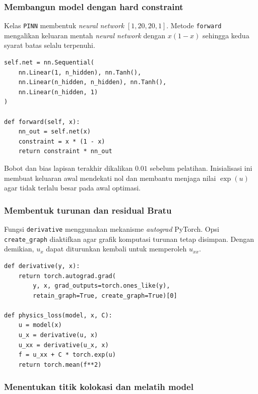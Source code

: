 \documentclass[12pt, letterpaper]{article}
\begin{document}
\subsubsection{Membangun model dengan hard constraint}

Kelas \texttt{PINN} membentuk \textit{neural network} $[1,20,20,1]$. Metode
\texttt{forward} mengalikan keluaran mentah \textit{neural network} dengan $x(1-x)$ sehingga
kedua syarat batas selalu terpenuhi.

\begin{lstlisting}[caption={Arsitektur PINN untuk persamaan Bratu}]
self.net = nn.Sequential(
    nn.Linear(1, n_hidden), nn.Tanh(),
    nn.Linear(n_hidden, n_hidden), nn.Tanh(),
    nn.Linear(n_hidden, 1)
)

def forward(self, x):
    nn_out = self.net(x)
    constraint = x * (1 - x)
    return constraint * nn_out
\end{lstlisting}

Bobot dan bias lapisan terakhir dikalikan $0.01$ sebelum pelatihan. Inisialisasi
ini membuat keluaran awal mendekati nol dan membantu menjaga nilai
$\exp(u)$ agar tidak terlalu besar pada awal optimasi.

\subsubsection{Membentuk turunan dan residual Bratu}

Fungsi \texttt{derivative} menggunakan mekanisme \textit{autograd} PyTorch.
Opsi \texttt{create\_graph} diaktifkan agar grafik komputasi turunan tetap
disimpan. Dengan demikian, $u_x$ dapat diturunkan kembali untuk memperoleh
$u_{xx}$.

\begin{lstlisting}[caption={Automatic differentiation dan residual Bratu}]
def derivative(y, x):
    return torch.autograd.grad(
        y, x, grad_outputs=torch.ones_like(y),
        retain_graph=True, create_graph=True)[0]

def physics_loss(model, x, C):
    u = model(x)
    u_x = derivative(u, x)
    u_xx = derivative(u_x, x)
    f = u_xx + C * torch.exp(u)
    return torch.mean(f**2)
\end{lstlisting}

\subsubsection{Menentukan titik kolokasi dan melatih model}
\end{document}
